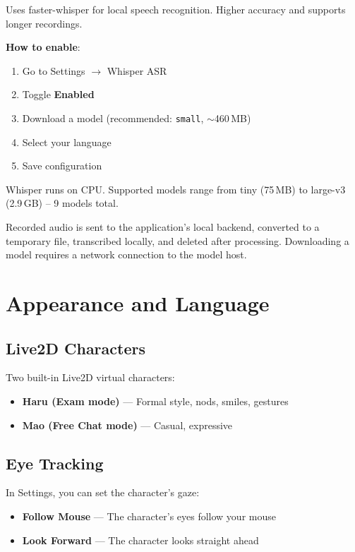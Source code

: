 \documentclass[12pt,a4paper]{article}
\begin{document}
Uses faster-whisper for local speech recognition. Higher accuracy and supports longer recordings.

\textbf{How to enable}:
\begin{enumerate}[leftmargin=*]
  \item Go to Settings $\to$ Whisper ASR
  \item Toggle \textbf{Enabled}
  \item Download a model (recommended: \texttt{small}, $\sim$460\,MB)
  \item Select your language
  \item Save configuration
\end{enumerate}

Whisper runs on CPU. Supported models range from tiny (75\,MB) to large-v3 (2.9\,GB) -- 9 models total.

Recorded audio is sent to the application's local backend, converted to a temporary file, transcribed locally, and deleted after processing. Downloading a model requires a network connection to the model host.

\section{Appearance and Language}

\subsection{Live2D Characters}

Two built-in Live2D virtual characters:

\begin{itemize}[leftmargin=*]
  \item \textbf{Haru (Exam mode)} --- Formal style, nods, smiles, gestures
  \item \textbf{Mao (Free Chat mode)} --- Casual, expressive
\end{itemize}

\subsection{Eye Tracking}

In Settings, you can set the character's gaze:
\begin{itemize}[leftmargin=*]
  \item \textbf{Follow Mouse} --- The character's eyes follow your mouse
  \item \textbf{Look Forward} --- The character looks straight ahead
\end{itemize}
\end{document}
